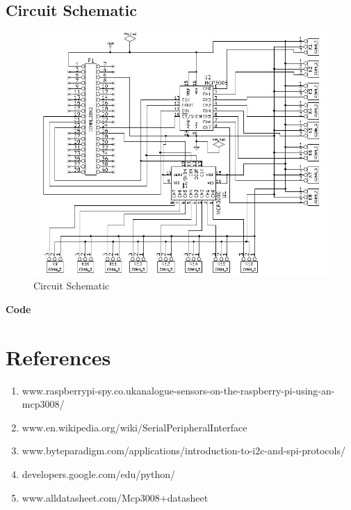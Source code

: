 \documentclass[11pt,a4paper]{article}
\begin{document}
  \subsection{Circuit Schematic}
        \begin{figure}[h!]
		\includegraphics[scale=0.6]{ckt_schematic2.jpg}
		\centering
        \caption{Circuit Schematic}
        \end{figure}

	\newpage 
	\textbf{Code}
	\vspace{0.3cm}
	
	

\newpage
\section{References}
		\begin{enumerate}
			\item www.raspberrypi-spy.co.ukanalogue-sensors-on-the-raspberry-pi-using-an-mcp3008/
			\item www.en.wikipedia.org/wiki/SerialPeripheralInterface
			\item www.byteparadigm.com/applications/introduction-to-i2c-and-spi-protocols/
			\item developers.google.com/edu/python/
            \item www.alldatasheet.com/Mcp3008+datasheet
		\end{enumerate}	
\end{document}
